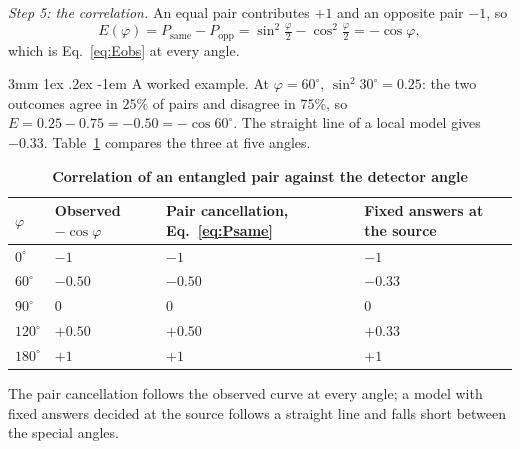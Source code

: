 \documentclass[%
 reprint, amsmath,amssymb, aps, prb, ]{revtex4-2}
\makeatletter
\numberwithin{equation}{section}
\renewcommand\paragraph{%
  \@startsection{paragraph}{4}{\z@}%
    {3mm \@plus 1ex \@minus .2ex}%
    {-1em}%
    {\normalfont\normalsize\itshape}}
\makeatother
\begin{document}
\emph{Step 5: the correlation.} An equal pair contributes $+1$ and an opposite pair $-1$, so
\begin{equation}
E(\varphi)=P_{\mathrm{same}}-P_{\mathrm{opp}}=\sin^2\!\tfrac{\varphi}{2}-\cos^2\!\tfrac{\varphi}{2}=-\cos\varphi ,
\end{equation}
which is Eq.~\eqref{eq:Eobs} at every angle.

\paragraph{A worked example.} At $\varphi=60^\circ$, $\sin^2 30^\circ=0.25$: the two outcomes agree in $25\%$ of pairs and disagree in $75\%$, so $E=0.25-0.75=-0.50=-\cos60^\circ$. The straight line of a local model gives $-0.33$. Table~\ref{tab:bell} compares the three at five angles.

\begin{table}[t!]
\centering
\caption{\textbf{Correlation of an entangled pair against the detector angle}}
\label{tab:bell}
\renewcommand{\arraystretch}{1.3}
\begin{tabular}{p{1.1cm}p{1.6cm}p{1.9cm}p{2.3cm}}
\toprule
\textbf{$\varphi$} & \textbf{Observed $-\cos\varphi$} & \textbf{Pair cancellation, Eq.~\eqref{eq:Psame}} & \textbf{Fixed answers at the source} \\
\midrule
$0^\circ$ & $-1$ & $-1$ & $-1$ \\
$60^\circ$ & $-0.50$ & $-0.50$ & $-0.33$ \\
$90^\circ$ & $0$ & $0$ & $0$ \\
$120^\circ$ & $+0.50$ & $+0.50$ & $+0.33$ \\
$180^\circ$ & $+1$ & $+1$ & $+1$ \\
\bottomrule
\end{tabular}
\vspace{0.2cm}
\begin{minipage}{0.95\columnwidth}
\justifying\footnotesize
The pair cancellation follows the observed curve at every angle; a model with fixed answers decided at the source follows a straight line and falls short between the special angles.
\end{minipage}
\end{table}
\end{document}
